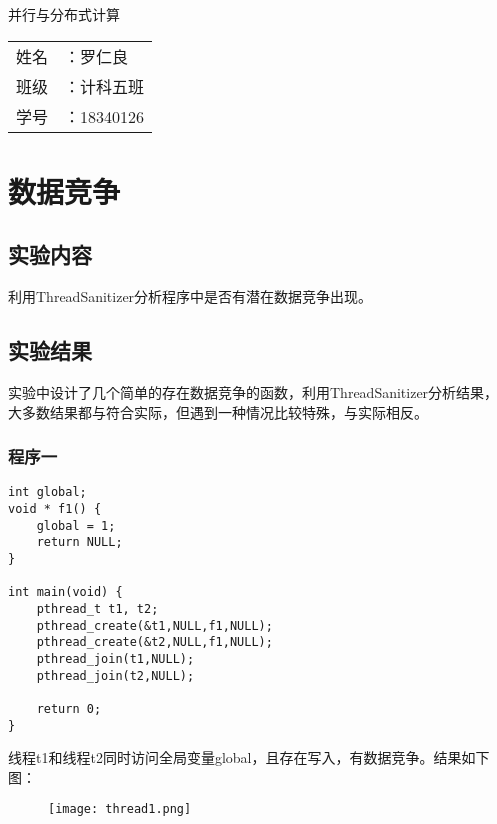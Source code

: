 \documentclass[UTF8]{ctexart}
\begin{document}
\begin{titlepage}
    \begin{center}
        {\Huge 并行与分布式计算 \\}
        \bigskip
    \vspace*{\fill}
    {\Large
    \begin{tabular}{rl}
        姓名 &：罗仁良 \\
        班级 &：计科五班 \\
        学号 &：18340126 \\
    \end{tabular}
    }
    \end{center}
\end{titlepage}
\section{数据竞争}
\subsection{实验内容}
利用ThreadSanitizer分析程序中是否有潜在数据竞争出现。
\subsection{实验结果}
实验中设计了几个简单的存在数据竞争的函数，利用ThreadSanitizer分析结果，大多数结果都与符合实际，但遇到一种情况比较特殊，与实际相反。
\subsubsection{程序一}
\begin{lstlisting}[frame=shadowbox, rulesepcolor=\color{red!20!green!20!blue!20}] 
int global;
void * f1() {
    global = 1;
    return NULL; 
}

int main(void) {
    pthread_t t1, t2;
    pthread_create(&t1,NULL,f1,NULL);
    pthread_create(&t2,NULL,f1,NULL);
    pthread_join(t1,NULL);
    pthread_join(t2,NULL);

    return 0;
}
\end{lstlisting}
线程t1和线程t2同时访问全局变量global，且存在写入，有数据竞争。结果如下图：
\newpage
\begin{figure}[h]
    \centering
    \texttt{[image: thread1.png]}
\end{figure}
\end{document}
